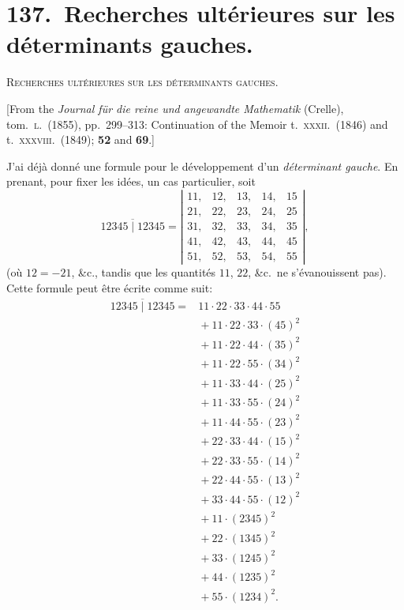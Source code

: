 \documentclass[11pt,a4paper]{article}
\begin{document}
\section*{137.\ Recherches ult\'erieures sur les d\'eterminants gauches.}

\begin{center}\textsc{Recherches ult\'erieures sur les d\'eterminants gauches.}\end{center}

[From the \textit{Journal f\"ur die reine und angewandte Mathematik} (Crelle), tom.\ \textsc{l}.\ (1855), pp.\ 299--313: Continuation of the Memoir t.\ \textsc{xxxii.}\ (1846) and t.\ \textsc{xxxviii.}\ (1849); \textbf{52} and \textbf{69}.]

\medskip

\noindent J'ai d\'ej\`a donn\'e une formule pour le d\'eveloppement d'un \textit{d\'eterminant gauche}. En prenant, pour fixer les id\'ees, un cas particulier, soit
\[
\overline{12345 \mid 12345} = \left\lvert\begin{array}{ccccc}
11, & 12, & 13, & 14, & 15\\
21, & 22, & 23, & 24, & 25\\
31, & 32, & 33, & 34, & 35\\
41, & 42, & 43, & 44, & 45\\
51, & 52, & 53, & 54, & 55
\end{array}\right\rvert ,
\]
(o\`u $12 = -21$, \&c., tandis que les quantit\'es $11$, $22$, \&c.\ ne s'\'evanouissent pas). Cette formule peut \^etre \'ecrite comme suit:
\begin{align*}
\overline{12345 \mid 12345} ={}& 11\cdot 22\cdot 33\cdot 44\cdot 55\\
&{}+11\cdot 22\cdot 33\cdot(45)^2\\
&{}+11\cdot 22\cdot 44\cdot(35)^2\\
&{}+11\cdot 22\cdot 55\cdot(34)^2\\
&{}+11\cdot 33\cdot 44\cdot(25)^2\\
&{}+11\cdot 33\cdot 55\cdot(24)^2\\
&{}+11\cdot 44\cdot 55\cdot(23)^2\\
&{}+22\cdot 33\cdot 44\cdot(15)^2\\
&{}+22\cdot 33\cdot 55\cdot(14)^2\\
&{}+22\cdot 44\cdot 55\cdot(13)^2\\
&{}+33\cdot 44\cdot 55\cdot(12)^2\\
&{}+11\cdot(2345)^2\\
&{}+22\cdot(1345)^2\\
&{}+33\cdot(1245)^2\\
&{}+44\cdot(1235)^2\\
&{}+55\cdot(1234)^2.
\end{align*}
\end{document}
